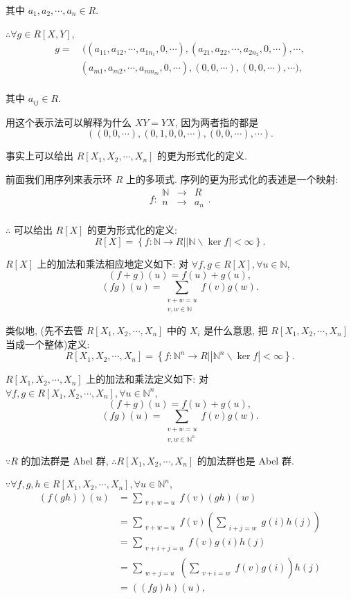 \documentclass[UTF8]{ctexart}
\begin{document}
其中 $a_1,a_2,\cdots,a_n\in R$.

$\therefore\forall g\in R[X,Y]$,
\begin{align*}
    g= & \ ((a_{11},a_{12},\cdots,a_{1n_1},0,\cdots),(a_{21},a_{22},\cdots,a_{2n_2},0,\cdots),\cdots, \\
    & (a_{m1},a_{m2},\cdots,a_{mn_m},0,\cdots),(0,0,\cdots),(0,0,\cdots),\cdots), \\
\end{align*}

其中 $a_{ij}\in R$.

用这个表示法可以解释为什么 $XY=YX$, 因为两者指的都是
\[((0,0,\cdots),(0,1,0,0,\cdots),(0,0,\cdots),\cdots).\]

事实上可以给出 $R[X_1,X_2,\cdots,X_n]$ 的更为形式化的定义.

前面我们用序列来表示环 $R$ 上的多项式. 序列的更为形式化的表述是一个映射:
\[f:\begin{array}{rcl}
    \mathbb{N} & \to & R \\
    n & \to & a_n \\
\end{array}.\]

$\therefore$ 可以给出 $R[X]$ 的更为形式化的定义:
\[R[X]=\left\{f:\mathbb{N}\to R\Big||\mathbb{N}\backslash\ker f|<\infty\right\}.\]

$R[X]$ 上的加法和乘法相应地定义如下: 对 $\forall f,g\in R[X],\forall u\in\mathbb{N}$, 
\[(f+g)(u)=f(u)+g(u),\]
\[(fg)(u)=\sum\limits_{\substack{v+w=u\\v,w\in\mathbb{N}}}f(v)g(w).\]

类似地, (先不去管 $R[X_1,X_2,\cdots,X_n]$ 中的 $X_i$ 是什么意思, 把 $R[X_1,X_2,\cdots,X_n]$ 当成一个整体)定义:
\[R[X_1,X_2,\cdots,X_n]=\left\{f:\mathbb{N}^n\to R\Big||\mathbb{N}^n\backslash\ker f|<\infty\right\}.\]

$R[X_1,X_2,\cdots,X_n]$ 上的加法和乘法定义如下: 对 $\forall f,g\in R[X_1,X_2,\cdots,X_n],\forall u\in\mathbb{N}^n$, 
\[(f+g)(u)=f(u)+g(u),\]
\[(fg)(u)=\sum\limits_{\substack{v+w=u\\v,w\in\mathbb{N}^n}}f(v)g(w).\]

$\because R$ 的加法群是 Abel 群, $\therefore R[X_1,X_2,\cdots,X_n]$ 的加法群也是 Abel 群.

$\because\forall f,g,h\in R[X_1,X_2,\cdots,X_n],\forall u\in\mathbb{N}^n$,
\begin{align*}
    (f(gh))(u) & =\sum\limits_{\substack{v+w=u}}f(v)(gh)(w) \\
    & =\sum\limits_{\substack{v+w=u}}f(v)\left(\sum\limits_{\substack{i+j=w}}g(i)h(j)\right) \\
    & =\sum\limits_{\substack{v+i+j=u}}f(v)g(i)h(j) \\
    & =\sum\limits_{\substack{w+j=u}}\left(\sum\limits_{\substack{v+i=w}}f(v)g(i)\right)h(j) \\
    & =((fg)h)(u),
\end{align*}
\end{document}
